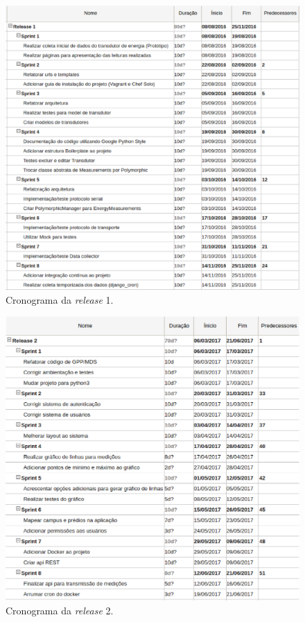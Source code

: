 \begin{figure}[!htpb]
    \centering
    \includegraphics[keepaspectratio=true,scale=0.5]{figuras/cronograma.eps}
    \caption{Cronograma da \textit{release} 1.}
    \label{cronograma}
\end{figure}

\begin{figure}[!htpb]
    \centering
    \includegraphics[keepaspectratio=true,scale=0.5]{figuras/cronograma_2.eps}
    \caption{Cronograma da \textit{release} 2.}
    \label{cronograma_2}
\end{figure}